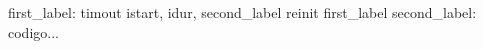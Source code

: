 first_label:
          timout    istart, idur, second_label
          reinit    first_label
second_label:
codigo...